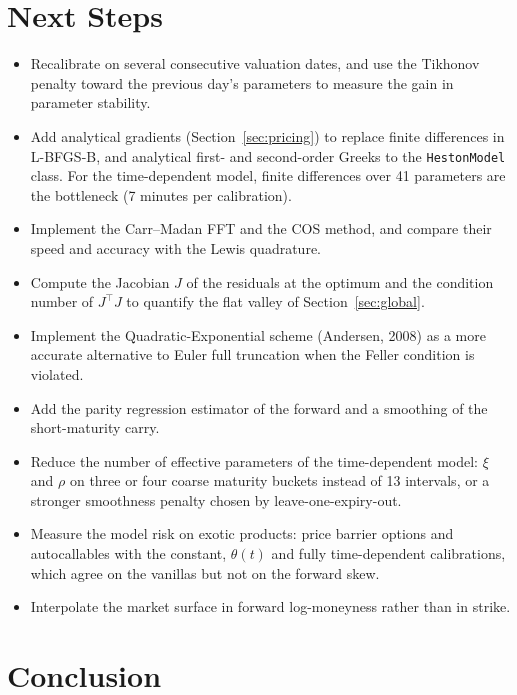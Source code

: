 \documentclass[11pt,a4paper]{article}
\theoremstyle{plain}
\theoremstyle{definition}
\begin{document}
\section{Next Steps}
\label{sec:next-steps}

\begin{itemize}
    \item Recalibrate on several consecutive valuation dates, and use the Tikhonov penalty toward the previous day's parameters to measure the gain in parameter stability.
    \item Add analytical gradients (Section~\ref{sec:pricing}) to replace finite differences in L-BFGS-B, and analytical first- and second-order Greeks to the \texttt{HestonModel} class. For the time-dependent model, finite differences over 41 parameters are the bottleneck (7 minutes per calibration).
    \item Implement the Carr--Madan FFT and the COS method, and compare their speed and accuracy with the Lewis quadrature.
    \item Compute the Jacobian $J$ of the residuals at the optimum and the condition number of $J^\top J$ to quantify the flat valley of Section~\ref{sec:global}.
    \item Implement the Quadratic-Exponential scheme (Andersen, 2008) as a more accurate alternative to Euler full truncation when the Feller condition is violated.
    \item Add the parity regression estimator of the forward and a smoothing of the short-maturity carry.
    \item Reduce the number of effective parameters of the time-dependent model: $\xi$ and $\rho$ on three or four coarse maturity buckets instead of 13 intervals, or a stronger smoothness penalty chosen by leave-one-expiry-out.
    \item Measure the model risk on exotic products: price barrier options and autocallables with the constant, $\theta(t)$ and fully time-dependent calibrations, which agree on the vanillas but not on the forward skew.
    \item Interpolate the market surface in forward log-moneyness rather than in strike.
\end{itemize}

\section{Conclusion}
\label{sec:conclusion}
\end{document}
